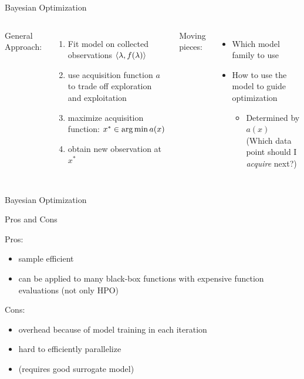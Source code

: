 \begin{frame}[c,fragile]{Bayesian Optimization }
\begin{columns}
General Approach:
\begin{enumerate}
  \item Fit model on collected observations $\langle{}\mathbf{\lambda}, f(\mathbf{\lambda})\rangle{}$
  \pause
  \item use acquisition function $a$ to trade off exploration and exploitation
  \pause
  \item maximize acquisition function: $x^* \in \operatorname*{arg\,min} a(x)$
  \pause
  \item obtain new observation at $x^*$
\end{enumerate}

\pause
Moving pieces:
\begin{itemize}
  	\item Which \alert{model family} to use 
	\item How to use the model to guide optimization
	\begin{itemize}
		\item Determined by $a(x)$\\
		(Which data point should I \emph{acquire} next?) 
	\end{itemize}
\end{itemize}

\end{columns}

\end{frame}

\begin{frame}[c,fragile]{Bayesian Optimization}

\begin{block}{Pros and Cons}

Pros:
\begin{itemize}
  \item sample efficient
  \item can be applied to many black-box functions with expensive function evaluations (not only HPO)
\end{itemize}

Cons:
\begin{itemize}
  \item overhead because of model training in each iteration
  \item hard to efficiently parallelize
  \item (requires good surrogate model)
\end{itemize}

\end{block}

\end{frame}


